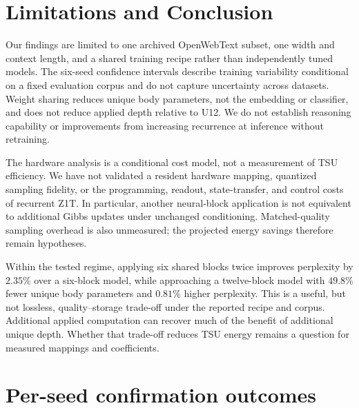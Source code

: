 \documentclass{article}
\begin{document}
\section{Limitations and Conclusion}

Our findings are limited to one archived OpenWebText subset, one width and context length, and a shared training recipe rather than independently tuned models. The six-seed confidence intervals describe training variability conditional on a fixed evaluation corpus and do not capture uncertainty across datasets. Weight sharing reduces unique body parameters, not the embedding or classifier, and does not reduce applied depth relative to U12. We do not establish reasoning capability or improvements from increasing recurrence at inference without retraining.

The hardware analysis is a conditional cost model, not a measurement of TSU efficiency. We have not validated a resident hardware mapping, quantized sampling fidelity, or the programming, readout, state-transfer, and control costs of recurrent Z1T. In particular, another neural-block application is not equivalent to additional Gibbs updates under unchanged conditioning. Matched-quality sampling overhead is also unmeasured; the projected energy savings therefore remain hypotheses.

Within the tested regime, applying six shared blocks twice improves perplexity by $2.35\%$ over a six-block model, while approaching a twelve-block model with $49.8\%$ fewer unique body parameters and $0.81\%$ higher perplexity. This is a useful, but not lossless, quality--storage trade-off under the reported recipe and corpus. Additional applied computation can recover much of the benefit of additional unique depth. Whether that trade-off reduces TSU energy remains a question for measured mappings and coefficients.

\appendix
\section{Per-seed confirmation outcomes}
\end{document}
